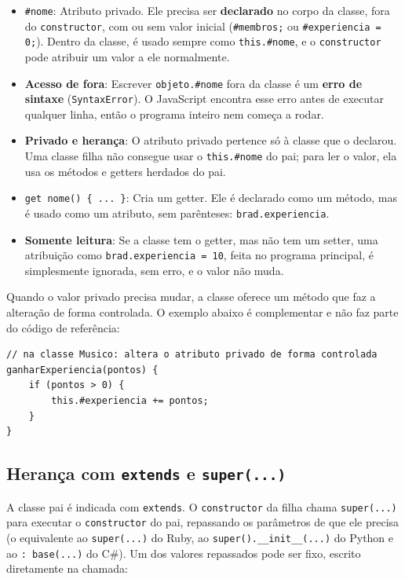 \begin{itemize}
    \item \texttt{\#nome}: Atributo privado. Ele precisa ser \textbf{declarado} no corpo da
    classe, fora do \texttt{constructor}, com ou sem valor inicial (\texttt{\#membros;} ou
    \texttt{\#experiencia = 0;}). Dentro da classe, é usado sempre como \texttt{this.\#nome}, e
    o \texttt{constructor} pode atribuir um valor a ele normalmente.

    \item \textbf{Acesso de fora}: Escrever \texttt{objeto.\#nome} fora da classe é um
    \textbf{erro de sintaxe} (\texttt{SyntaxError}). O JavaScript encontra esse erro antes de
    executar qualquer linha, então o programa inteiro nem começa a rodar.

    \item \textbf{Privado e herança}: O atributo privado pertence só à classe que o declarou. Uma
    classe filha não consegue usar o \texttt{this.\#nome} do pai; para ler o valor, ela usa os
    métodos e getters herdados do pai.

    \item \texttt{get nome() \{ ... \}}: Cria um getter. Ele é declarado como um método, mas é
    usado como um atributo, sem parênteses: \texttt{brad.experiencia}.

    \item \textbf{Somente leitura}: Se a classe tem o getter, mas não tem um setter, uma
    atribuição como \texttt{brad.experiencia = 10}, feita no programa principal, é simplesmente
    ignorada, sem erro, e o valor não muda.
\end{itemize}

Quando o valor privado precisa mudar, a classe oferece um método que faz a alteração de forma
controlada. O exemplo abaixo é complementar e não faz parte do código de referência:

\begin{lstlisting}[style=javascript]
// na classe Musico: altera o atributo privado de forma controlada
ganharExperiencia(pontos) {
    if (pontos > 0) {
        this.#experiencia += pontos;
    }
}
\end{lstlisting}

\subsection{Herança com \texttt{extends} e \texttt{super(...)}}

A classe pai é indicada com \texttt{extends}. O \texttt{constructor} da filha chama
\texttt{super(...)} para executar o \texttt{constructor} do pai, repassando os parâmetros de que
ele precisa (o equivalente ao \texttt{super(...)} do Ruby, ao \texttt{super().\_\_init\_\_(...)}
do Python e ao \texttt{: base(...)} do C\#). Um dos valores repassados pode ser fixo, escrito
diretamente na chamada:

